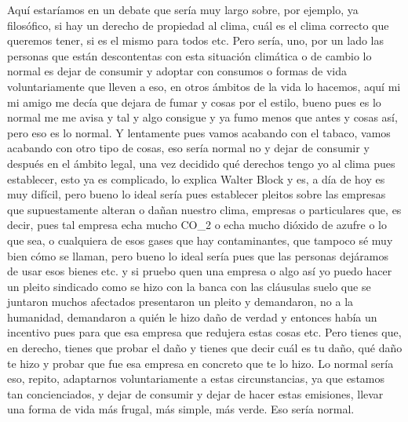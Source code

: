 Aquí estaríamos en un debate que sería muy largo sobre, por ejemplo, ya filosófico, si hay un derecho de propiedad al clima, cuál es el clima correcto que queremos tener, si es el mismo para todos etc. Pero sería, uno, por un lado las personas que están descontentas con esta situación climática o de cambio lo normal es dejar de consumir y adoptar con consumos o formas de vida voluntariamente que lleven a eso, en otros ámbitos de la vida lo hacemos, aquí mi mi amigo me decía que dejara de fumar y cosas por el estilo, bueno pues es lo normal me me avisa y tal y algo consigue y ya fumo menos que antes y cosas así, pero eso es lo normal. Y lentamente pues vamos acabando con el tabaco, vamos acabando con otro tipo de cosas, eso sería normal no y dejar de consumir y después en el ámbito legal, una vez decidido qué derechos tengo yo al clima pues establecer, esto ya es complicado, lo explica Walter Block y es, a día de hoy es muy difícil, pero bueno lo ideal sería pues establecer pleitos sobre las empresas que supuestamente alteran o dañan nuestro clima, empresas o particulares que, es decir, pues tal empresa echa mucho CO_{2} o echa mucho dióxido de azufre o lo que sea, o cualquiera de esos gases que hay contaminantes, que tampoco sé muy bien cómo se llaman, pero bueno lo ideal sería pues que las personas dejáramos de usar esos bienes etc. y si pruebo quen una empresa o algo así yo puedo hacer un pleito sindicado como se hizo con la banca con las cláusulas suelo que se juntaron muchos afectados presentaron un pleito y demandaron, no a la humanidad, demandaron a quién le hizo daño de verdad y entonces había un incentivo pues para que esa empresa que redujera estas cosas etc. Pero tienes que, en derecho, tienes que probar el daño y tienes que decir cuál es tu daño, qué daño te hizo y probar que fue esa empresa en concreto que te lo hizo. Lo normal sería eso, repito, adaptarnos voluntariamente a estas circunstancias, ya que estamos tan concienciados, y dejar de consumir y dejar de hacer estas emisiones, llevar una forma de vida más frugal, más simple, más verde. Eso sería normal.


